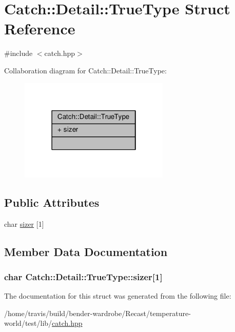 \hypertarget{struct_catch_1_1_detail_1_1_true_type}{\section{Catch\-:\-:Detail\-:\-:True\-Type Struct Reference}
\label{struct_catch_1_1_detail_1_1_true_type}
}


{\ttfamily \#include $<$catch.\-hpp$>$}



Collaboration diagram for Catch\-:\-:Detail\-:\-:True\-Type\-:
\nopagebreak
\begin{figure}[H]
\begin{center}
\leavevmode
\includegraphics[width=202pt]{struct_catch_1_1_detail_1_1_true_type__coll__graph}
\end{center}
\end{figure}
\subsection*{Public Attributes}
\begin{DoxyCompactItemize}
\item 
char \hyperlink{struct_catch_1_1_detail_1_1_true_type_a3aaaeb75909e668b293c8a81f5fb6419}{sizer} \mbox{[}1\mbox{]}
\end{DoxyCompactItemize}


\subsection{Member Data Documentation}
\hypertarget{struct_catch_1_1_detail_1_1_true_type_a3aaaeb75909e668b293c8a81f5fb6419}{
\subsubsection[{sizer}]{\setlength{\rightskip}{0pt plus 5cm}char Catch\-::\-Detail\-::\-True\-Type\-::sizer\mbox{[}1\mbox{]}}}\label{struct_catch_1_1_detail_1_1_true_type_a3aaaeb75909e668b293c8a81f5fb6419}


The documentation for this struct was generated from the following file\-:\begin{DoxyCompactItemize}
\item 
/home/travis/build/bender-\/wardrobe/\-Recast/temperature-\/world/test/lib/\hyperlink{catch_8hpp}{catch.\-hpp}\end{DoxyCompactItemize}
